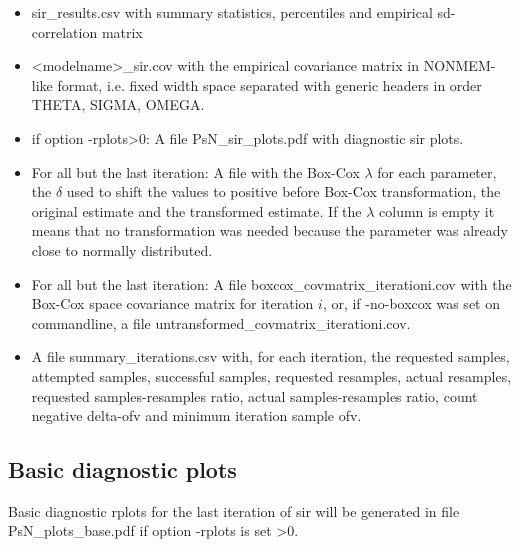 \begin{itemize}
\item sir\_results.csv with summary statistics, percentiles and empirical sd-correlation matrix
\item <modelname>\_sir.cov with the empirical covariance matrix in NONMEM-like format, i.e. 
      fixed width space separated with generic headers in order THETA, SIGMA, OMEGA.
\item if option -rplots>0: A file PsN\_sir\_plots.pdf with diagnostic sir plots.
\item For all but the last iteration: A file with the Box-Cox $\lambda$ for each parameter, the $\delta$ used to shift
the values to positive before Box-Cox transformation, the original estimate and the transformed estimate. 
If the $\lambda$ column is empty it means that no transformation was
needed because the parameter was already close to normally distributed.
\item For all but the last iteration: A file boxcox\_covmatrix\_iterationi.cov with 
the Box-Cox space covariance matrix for iteration $i$,
or, if -no-boxcox was set on commandline, a file untransformed\_covmatrix\_iterationi.cov.
\item A file summary\_iterations.csv with, for each iteration, 
the requested samples, attempted samples, successful samples, requested resamples,
actual resamples, requested samples-resamples ratio, actual samples-resamples ratio, count negative delta-ofv and minimum iteration sample ofv.
\end{itemize}

\subsection{Basic diagnostic plots}
Basic diagnostic rplots for the last iteration of sir will be generated 
in file  PsN\_plots\_base.pdf 
if option -rplots is set >0.

